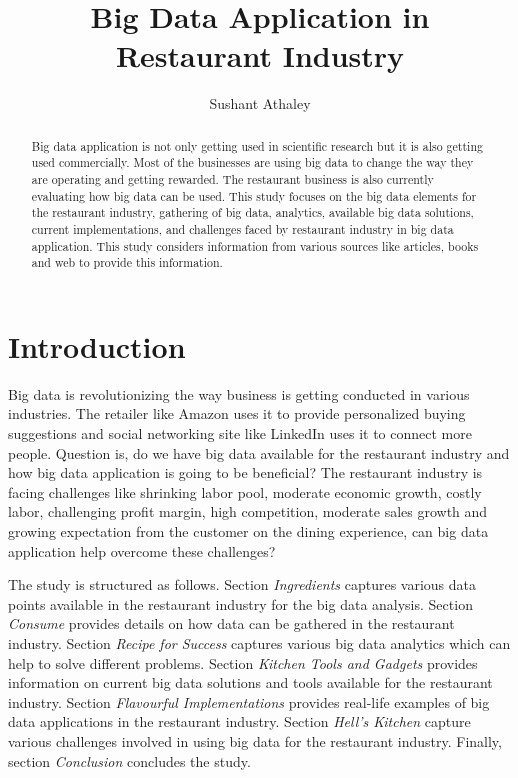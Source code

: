 \documentclass[sigconf]{acmart}
\begin{document}
\title{Big Data Application in Restaurant Industry}


\author{Sushant Athaley}



\begin{abstract}
Big data application is not only getting used in scientific research but it is also getting used commercially. Most of the businesses are using big data to change the way they are operating and getting rewarded. The restaurant business is also currently evaluating how big data can be used. This study focuses on the big data elements for the restaurant industry, gathering of big data, analytics, available big data solutions, current implementations, and challenges faced by restaurant industry in big data application. This study considers information from various sources like articles, books and web to provide this information.
\end{abstract}



\maketitle

\section{Introduction}
Big data is revolutionizing the way business is getting conducted in various industries. The retailer like Amazon uses it to provide personalized buying suggestions and social networking site like LinkedIn uses it to connect more people. Question is, do we have big data available for the restaurant industry and how big data application is going to be beneficial? The restaurant industry is facing challenges like shrinking labor pool, moderate economic growth, costly labor, challenging profit margin, high competition, moderate sales growth and growing expectation from the customer on the dining experience, can big data application help overcome these challenges?\cite{www-restaurant-challenges}

The study is structured as follows. Section {\em Ingredients} captures various data points available in the restaurant industry for the big data analysis. Section {\em Consume} provides details on how data can be gathered in the restaurant industry. Section {\em Recipe for Success} captures various big data analytics which can help to solve different problems. Section {\em Kitchen Tools and Gadgets} provides information on current big data solutions and tools available for the restaurant industry. Section {\em Flavourful Implementations} provides real-life examples of big data applications in the restaurant industry. Section {\em Hell's Kitchen} capture various challenges involved in using big data for the restaurant industry. Finally, section {\em Conclusion} concludes the study.
\end{document}
